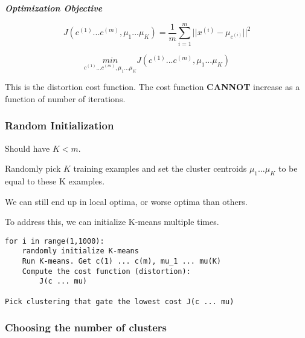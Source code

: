 \documentclass{article}
\begin{document}
\begin{mybox}

\begin{center}
\textbf{\textit{Optimization Objective}}
\end{center}

\begin{equation}
    J(c^{(1)} ... c^{(m)}, \mu_1 ... \mu_K ) = \frac{1}{m} \sum_{i=1}^m \vert \vert x^{(i)} - \mu_{c^{(i)}} \vert \vert ^2 
\end{equation}


\begin{equation}
    \underset{c^{(1)} ... c^{(m)}, \mu_1 ... \mu_K}{min} J(c^{(1)} ... c^{(m)}, \mu_1 ... \mu_K )
\end{equation}

This is the distortion cost function. The cost function \textbf{CANNOT} increase as a function of number of iterations.
\end{mybox}





\subsubsection{Random Initialization}

Should have $K < m$.

Randomly pick $K$ training examples and set the cluster centroids $\mu_1 ... \mu_K$ to be equal to these K examples.

We can still end up in local optima, or worse optima than others.

To address this, we can initialize K-means multiple times.


\begin{myboxb}

\begin{verbatim}
for i in range(1,1000):
    randomly initialize K-means
    Run K-means. Get c(1) ... c(m), mu_1 ... mu(K)
    Compute the cost function (distortion):
        J(c ... mu)

Pick clustering that gate the lowest cost J(c ... mu)
\end{verbatim}

\end{myboxb}




\subsubsection{Choosing the number of clusters}
\end{document}
